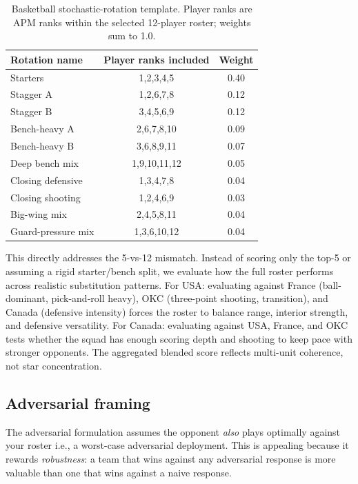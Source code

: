 \documentclass[11pt,letterpaper]{article}
\begin{document}
\begin{table}[htbp]
  \centering
  \small
  \caption{Basketball stochastic-rotation template. Player ranks are
    APM ranks within the selected 12-player roster; weights sum to 1.0.}
  \begin{tabular}{l c c}
    \toprule
    Rotation name & Player ranks included & Weight \\
    \midrule
    Starters & 1,2,3,4,5 & 0.40 \\
    Stagger A & 1,2,6,7,8 & 0.12 \\
    Stagger B & 3,4,5,6,9 & 0.12 \\
    Bench-heavy A & 2,6,7,8,10 & 0.09 \\
    Bench-heavy B & 3,6,8,9,11 & 0.07 \\
    Deep bench mix & 1,9,10,11,12 & 0.05 \\
    Closing defensive & 1,3,4,7,8 & 0.04 \\
    Closing shooting & 1,2,4,6,9 & 0.03 \\
    Big-wing mix & 2,4,5,8,11 & 0.04 \\
    Guard-pressure mix & 1,3,6,10,12 & 0.04 \\
    \bottomrule
  \end{tabular}
\end{table}

This directly addresses the 5-vs-12 mismatch. Instead of scoring only
the top-5 or assuming a rigid starter/bench split, we evaluate how the
full roster performs across realistic substitution patterns. For USA:
evaluating against France (ball-dominant, pick-and-roll heavy), OKC
(three-point shooting, transition), and Canada (defensive intensity)
forces the roster to balance range, interior strength, and defensive
versatility. For Canada: evaluating against USA, France, and OKC tests
whether the squad has enough scoring depth and shooting to keep pace
with stronger opponents.
The aggregated blended score reflects multi-unit coherence, not star
concentration.

\subsection{Adversarial framing}

The adversarial formulation assumes the opponent \emph{also} plays
optimally against your roster i.e., a worst-case adversarial
deployment. This is appealing because it rewards \emph{robustness}: a
team that wins against any adversarial response is more valuable than
one that wins against a naive response.
\end{document}
